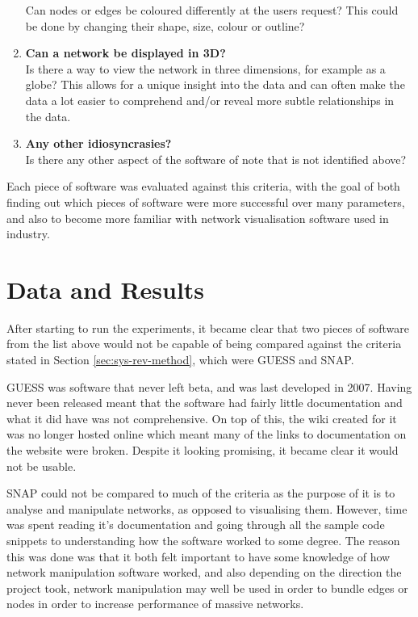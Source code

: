 \documentclass[../dissertation.tex]{subfiles}
\begin{document}
\begin{enumerate}
	Can nodes or edges be coloured differently at the users request? This could be done by changing their shape, size, colour or outline?
	\item \textbf{Can a network be displayed in 3D?}\\
	Is there a way to view the network in three dimensions, for example as a globe? This allows for a unique insight into the data and can often make the data a lot easier to comprehend and/or reveal more subtle relationships in the data.
	\item \textbf{Any other idiosyncrasies?}\\
	Is there any other aspect of the software of note that is not identified above?
\end{enumerate}

Each piece of software was evaluated against this criteria, with the goal of both finding out which pieces of software were more successful over many parameters, and also to become more familiar with network visualisation software used in industry.

\section{Data and Results}

After starting to run the experiments, it became clear that two pieces of software from the list above would not be capable of being compared against the criteria stated in Section \ref{sec:sys-rev-method}, which were GUESS and SNAP.

GUESS was software that never left beta, and was last developed in 2007. Having never been released meant that the software had fairly little documentation and what it did have was not comprehensive. On top of this, the wiki created for it was no longer hosted online which meant many of the links to documentation on the website were broken. Despite it looking promising, it became clear it would not be usable.

SNAP could not be compared to much of the criteria as the purpose of it is to analyse and manipulate networks, as opposed to visualising them. However, time was spent reading it’s documentation and going through all the sample code snippets to understanding how the software worked to some degree. The reason this was done was that it both felt important to have some knowledge of how network manipulation software worked, and also depending on the direction the project took, network manipulation may well be used in order to bundle edges or nodes in order to increase performance of massive networks.
\end{document}
